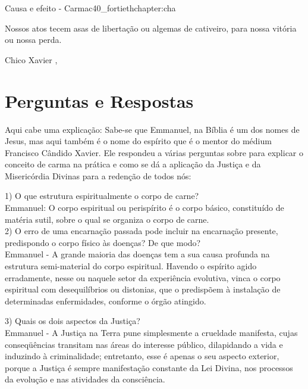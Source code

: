 \begin{chapterpage}{Causa e efeito - Carma}{c40_fortiethchapter:cha}
 
\begin{myquotation}Nossos atos tecem asas de libertação ou algemas de cativeiro, para nossa vitória ou nossa perda. 
\par\vspace*{15mm}
\mbox{}\hfill \emdash{}Chico Xavier
, %
\par\end{myquotation}

\end{chapterpage}



\section{Perguntas e Respostas}\label{c1_basicformatting:sec}

\emdash{}Aqui cabe uma explicação: Sabe-se que Emmanuel, na Bíblia é um dos nomes de Jesus, mas aqui também é o nome do espírito que é o mentor do médium Francisco Cândido Xavier. Ele respondeu a várias perguntas sobre para explicar o conceito de carma na prática e como se dá a aplicação da Justiça e da Misericórdia Divinas para a redenção de todos nós:


\emdash{}1) O que estrutura espiritualmente o corpo de carne?\\
\emdash{}Emmanuel: O corpo espiritual ou perispírito é o corpo básico, constituído de matéria sutil, sobre o qual se organiza o corpo de carne.\\

\emdash{}2) O erro de uma encarnação passada pode incluir na encarnação presente, predispondo o corpo físico às doenças? De que modo?\\
\emdash{}Emmanuel - A grande maioria das doenças tem a sua causa profunda na estrutura semi-material do corpo espiritual. Havendo o espírito agido erradamente, nesse ou naquele setor da experiência evolutiva, vinca o corpo espiritual com desequilíbrios ou distonias, que o predispõem à instalação de determinadas enfermidades, conforme o órgão atingido.

\emdash{}3) Quais os dois aspectos da Justiça?\\
\emdash{}Emmanuel - A Justiça na Terra pune simplesmente a crueldade manifesta, cujas conseqüências transitam nas áreas do interesse público, dilapidando a vida e induzindo à criminalidade; entretanto, esse é apenas o seu aspecto exterior, porque a Justiça é sempre manifestação constante da Lei Divina, nos processos da evolução e nas atividades da consciência.

